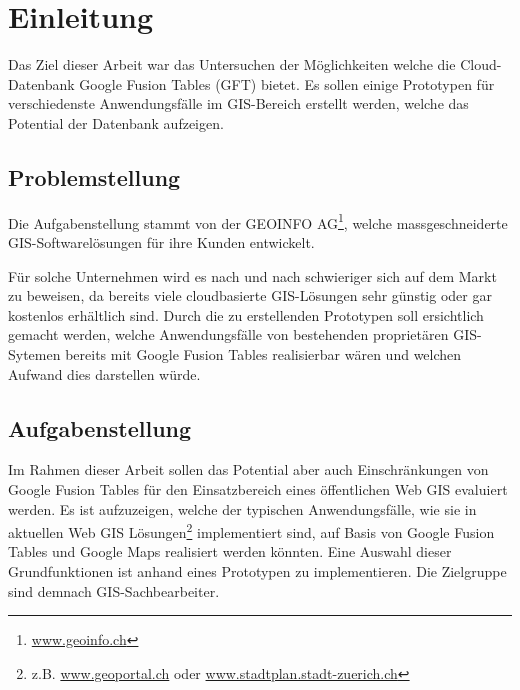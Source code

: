 \chapter{Einleitung}
\label{einleitung}
Das Ziel dieser Arbeit war das Untersuchen der Möglichkeiten welche die \gls{Cloud}-Datenbank Google Fusion Tables (GFT) bietet. Es sollen einige Prototypen für verschiedenste Anwendungsfälle im \gls{GIS}-Bereich erstellt werden, welche das Potential der Datenbank aufzeigen.

\section{Problemstellung}
Die Aufgabenstellung stammt von der GEOINFO AG\footnote{\url{www.geoinfo.ch}}, welche massgeschneiderte \gls{GIS}-Softwarelösungen für ihre Kunden entwickelt.

Für solche Unternehmen wird es nach und nach schwieriger sich auf dem Markt zu beweisen, da bereits viele cloudbasierte \gls{GIS}-Lösungen sehr günstig oder gar kostenlos erhältlich sind. Durch die zu erstellenden Prototypen soll ersichtlich gemacht werden, welche Anwendungsfälle von bestehenden proprietären \gls{GIS}-Sytemen bereits mit Google Fusion Tables realisierbar wären und welchen Aufwand dies darstellen würde.

\section{Aufgabenstellung}
Im Rahmen dieser Arbeit sollen das Potential aber auch Einschränkungen von Google Fusion Tables für den Einsatzbereich eines öffentlichen Web \gls{GIS} evaluiert werden. Es ist aufzuzeigen, welche der typischen Anwendungsfälle, wie sie in aktuellen Web GIS Lösungen\footnote{z.B. \url{www.geoportal.ch} oder \url{www.stadtplan.stadt-zuerich.ch}} implementiert sind, auf Basis von Google Fusion Tables und Google Maps realisiert werden könnten. Eine Auswahl dieser Grundfunktionen ist anhand eines Prototypen zu implementieren. Die Zielgruppe sind demnach \gls{GIS}-Sachbearbeiter.

